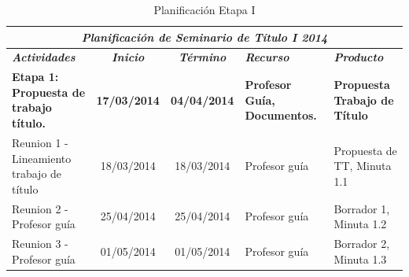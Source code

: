 \documentclass[12pt,letterpaper]{article}
\begin{document}
\begin{table}[htf]
\begin{tabular}{| p{4cm} | c | c | p{3cm}  | p{2.5cm} |}
\hline

\multicolumn{5}{|c|}{\textbf{\textit{Planificaci\'on de Seminario de T\'itulo I 2014}}} \\ \hline \hline
\textit{\textbf{Actividades}} & 
\textit{\textbf{Inicio}} & 
\textit{\textbf{T\'ermino}} & 
\centering \textit{\textbf{Recurso}} & 
\textit{\textbf{Producto}} \\ \hline \hline
\textbf{Etapa 1: Propuesta de trabajo t\'itulo.} & 
\textbf{17/03/2014} & 
\textbf{04/04/2014} & 
\textbf{Profesor Gu\'ia, Documentos.} & 
\textbf{Propuesta Trabajo de T\'itulo} \\ \hline


Reunion 1 - Lineamiento trabajo de t\'itulo& 
18/03/2014 & 
18/03/2014 &  
Profesor gu\'ia & 
Propuesta de TT, Minuta 1.1 \\ \hline

Reunion 2 - Profesor gu\'ia & 
25/04/2014 & 
25/04/2014 &  
Profesor gu\'ia & 
Borrador 1, Minuta 1.2\\ \hline

Reunion 3 - Profesor gu\'ia & 
01/05/2014 & 
01/05/2014 &  
Profesor gu\'ia & 
Borrador 2, Minuta 1.3 \\ \hline


\hline
\end{tabular}
\caption{Planificaci\'on Etapa I}
\end{table}





\end{document}
